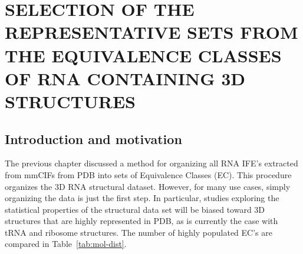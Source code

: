 \chapter{SELECTION OF THE REPRESENTATIVE SETS FROM THE EQUIVALENCE CLASSES OF
RNA CONTAINING 3D STRUCTURES}

\section{Introduction and motivation}

The previous chapter discussed a method for organizing all RNA IFE's extracted
from mmCIFs from PDB into sets of Equivalence Classes (EC). This procedure
organizes the 3D RNA structural dataset. However, for many use cases, simply
organizing the data is just the first step. In particular, studies exploring the
statistical properties of the structural data set will be biased toward 3D
structures that are highly represented in PDB, as is currently the case with
tRNA and ribosome structures. The number of highly populated EC's are compared in
Table~\ref{tab:mol-dist}.

